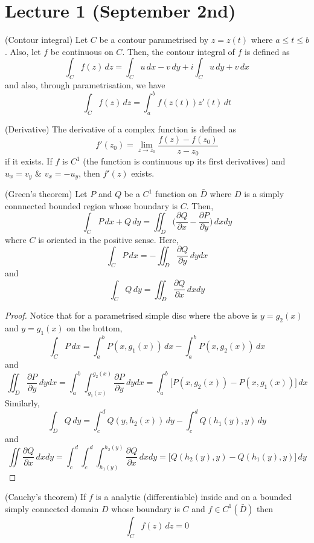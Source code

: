 \section{Lecture 1 (September 2nd)}
\begin{defi}
(Contour integral) Let $C$ be a contour parametrised by $z=z(t)$ where $a\leq t\leq b$. Also, let $f$ be continuous on $C$. Then, the contour integral of $f$ is defined as
\[\int _{C}f(z)\,dz=\int _{C}u\,dx-v\,dy+i\int _{C}u\,dy+v\,dx\]
and also, through parametrisation, we have
\[\int _{C}f(z)\,dz=\int ^{b}_{a}f(z(t))z'(t)\,dt\]
\end{defi}
\vspace{2ex}
\begin{defi}
(Derivative) The derivative of a complex function is defined as
\[f'(z_0)=\lim _{z\rightarrow z_0}\dfrac{f(z)-f(z_0)}{z-z_0}\]
if it exists. If $f$ is $C^{1}$ (the function is continuous up its first derivatives) and $u_{x}=v_{y}$ \& $v_{x}=-u_{y}$, then $f'(z)$ exists. 
\end{defi}
\vspace{2ex}
\begin{thm}
(Green's theorem) Let $P$ and $Q$ be a $C^{1}$ function on $\bar{D}$ where $D$ is a simply connnected bounded region whose boundary is $C$. Then,
\[\int _{C}P\,dx+Q\,dy=\iint_{D}\Big(\dfrac{\partial Q}{\partial x}-\dfrac{\partial P}{\partial y}\Big)\,dxdy\]
where $C$ is oriented in the positive sense. Here,
\[\int _{C}P\,dx=-\iint_{D} \dfrac{\partial  Q}{\partial y}\,dydx \]
and
\[\int _{C}Q\,dy=\iint_{D}\dfrac{\partial Q}{\partial x}\,dxdy \]
\end{thm}
\vspace{2ex}
\begin{proof}
Notice that for a parametrised simple disc where the above is $y=g_2(x)$ and $y=g_1(x)$ on the bottom,
\[\int _{C}P\,dx=\int _{a}^{b}P(x,g_1(x))\,dx-\int ^{b}_{a}P(x,g_{2}(x))\,dx\]
and
\[\iint_{D}\dfrac{\partial P}{\partial y}\,dydx=\int ^{b}_{a}\int ^{g_{2}(x)}_{g_{1}(x)}\dfrac{\partial P}{\partial y}\,dydx=\int ^{b}_{a}\Big[P(x,g_2(x))-P(x,g_1(x))\Big]\,dx  \]
Similarly,
\[\int _{D}Q\,dy=\int _{c}^{d}Q(y,h_2(x))\,dy-\int _{c}^{d}Q(h_1(y),y)\,dy\]
and
\[\iint \dfrac{\partial Q}{\partial x}\,dxdy=\int ^{d}_{c}\int_{c}^{d}\int ^{h_2(y)}_{h_1(y)}\dfrac{\partial Q}{\partial x}\,dxdy= \Big[Q(h_2(y),y)-Q(h_1(y),y)\Big]\,dy \]
\end{proof}
\vspace{2ex}
\begin{thm}
(Cauchy's theorem) If $f$ is a analytic (differentiable) inside and on a bounded simply connected domain $D$ whose boundary is $C$ and $f\in C^{1}(\bar{D})$ then 
\[\int _{C}f(z)\,dz=0\]
\end{thm}
